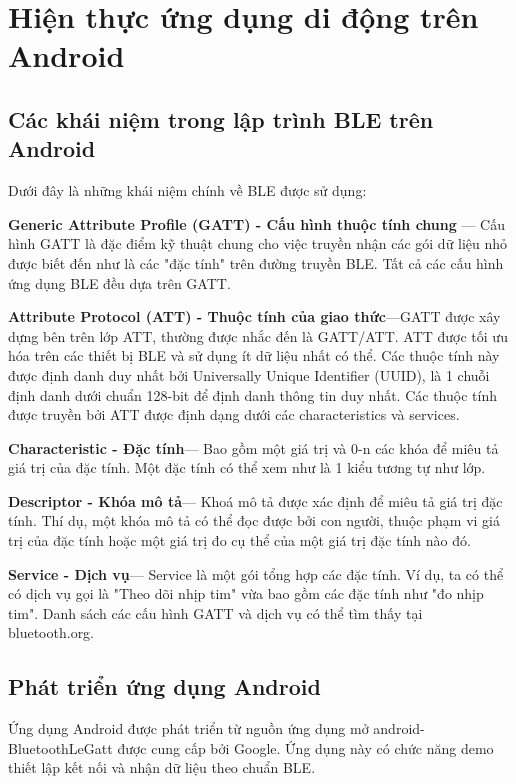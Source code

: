 \section{Hiện thực ứng dụng di động trên Android}

\subsection{Các khái niệm trong lập trình BLE trên Android}
\label{sec: bleterm}
Dưới đây là những khái niệm chính về BLE được sử dụng: \cite{deva}

\textbf{Generic Attribute Profile (GATT) -  Cấu hình thuộc tính chung }— Cấu hình GATT là đặc điểm kỹ thuật chung cho việc truyền nhận các gói dữ liệu nhỏ được biết đến như là các "đặc tính" trên đường truyền BLE. Tất cả các cấu hình ứng dụng BLE đều dựa trên GATT.

\textbf{Attribute Protocol (ATT) - Thuộc tính của giao thức}—GATT được xây dựng bên trên lớp ATT, thường được nhắc đến là GATT/ATT. ATT được tối ưu hóa trên các thiết bị BLE và sử dụng ít dữ liệu nhất có thể. Các thuộc tính này được định danh duy nhất bởi Universally Unique Identifier (UUID), là 1 chuỗi định danh dưới chuẩn 128-bit để định danh thông tin duy nhất. Các thuộc tính được truyền bởi ATT được định dạng dưới các characteristics và services.

\textbf{Characteristic -  Đặc tính}— Bao gồm một giá trị và 0-n các khóa để miêu tả giá trị của đặc tính. Một đặc tính có thể xem như là 1 kiểu tương tự như lớp.

\textbf{Descriptor - Khóa mô tả}— Khoá mô tả được xác định để miêu tả giá trị đặc tính. Thí dụ, một khóa mô tả có thể đọc được bởi con người, thuộc phạm vi giá trị của đặc tính hoặc một giá trị đo cụ thể của một giá trị đặc tính nào đó.

\textbf{Service - Dịch vụ}— Service là một gói tổng hợp các đặc tính. Ví dụ, ta có thể có dịch vụ gọi là "Theo dõi nhịp tim" vừa bao gồm các đặc tính như "đo nhịp tim". Danh sách các cấu hình GATT và dịch vụ có thể tìm thấy tại bluetooth.org.

\subsection{Phát triển ứng dụng Android}
Ứng dụng Android được phát triển từ nguồn ứng dụng mở android-BluetoothLeGatt\cite{blegatt} được cung cấp bởi Google. Ứng dụng này có chức năng demo thiết lập kết nối và nhận dữ liệu theo chuẩn BLE.

